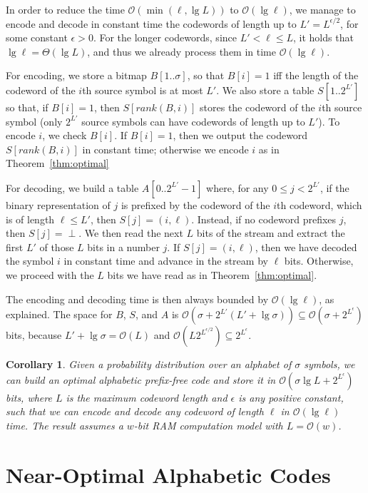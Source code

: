 \documentclass[preprint,12pt]{elsarticle}
\newcommand{\Oh}[1]{\ensuremath{\mathcal{O}\!\left({#1}\right)}}
\renewcommand{\log}{\lg}
\newtheorem{corollary}[theorem]{Corollary}
\begin{document}
In order to reduce the time $\Oh{\min(\ell,\log L)}$ to $\Oh{\log\ell}$, we 
manage to encode and decode in constant time the codewords of length up to
$L' = L^{\epsilon/2}$, for some constant $\epsilon>0$. For the longer codewords,
since $L' < \ell \le L$, it holds that $\log\ell = \Theta(\log L)$, and thus
we already process them in time $\Oh{\log\ell}$.

For encoding, we store a bitmap $B[1..\sigma]$, so that $B[i]=1$ iff the
length of the codeword of the $i$th source symbol is at most $L'$. We also 
store a table $S[1..2^{L'}]$ so that, if $B[i]=1$, then $S[rank(B,i)]$ stores 
the codeword of the $i$th source symbol (only $2^{L'}$ source symbols can have
codewords of length up to $L'$). To encode $i$, we check
$B[i]$. If $B[i]=1$, then we output the codeword $S[rank(B,i)]$ in constant
time; otherwise we encode $i$ as in Theorem~\ref{thm:optimal}

For decoding, we build a table $A[0..2^{L'}-1]$ where, for any 
$0 \le j < 2^{L'}$, if the binary representation of $j$ is prefixed by the 
codeword of the $i$th codeword, which is of length $\ell \le L'$, then
$S[j] = (i,\ell)$. Instead, if no codeword prefixes $j$, then $S[j]=\perp$.
We then read the next $L$ bits of the stream and extract the first $L'$ of those
$L$ bits in a number $j$. If $S[j]=(i,\ell)$, then we have decoded the symbol
$i$ in constant time and advance in the stream by $\ell$ bits. Otherwise, we
proceed with the $L$ bits we have read as in Theorem~\ref{thm:optimal}.

The encoding and decoding time is then always bounded by $\Oh{\log\ell}$, as 
explained. The space for $B$, $S$, and $A$ is 
$\Oh{\sigma + 2^{L'}(L'+\log\sigma)} \subseteq
\Oh{\sigma + 2^{L^\epsilon}}$ bits, because $L'+\log\sigma = \Oh{L}$ and
$\Oh{L2^{L^{\epsilon/2}}} \subseteq 2^{L^\epsilon}$.

\begin{corollary}
\label{cor:optimal}
Given a probability distribution over an alphabet of $\sigma$ symbols, we can 
build an optimal alphabetic prefix-free code and store it in $\Oh{\sigma \lg L+
2^{L^\epsilon}}$ bits, where $L$ is the maximum codeword length and $\epsilon$ 
is any positive constant, such that we can encode and decode any codeword of 
length $\ell$ in $\Oh{\log \ell}$ time.
The result assumes a $w$-bit RAM computation model with $L=\Oh{w}$.
\end{corollary}

\section{Near-Optimal Alphabetic Codes}
\label{sec:alphabetic2}
\end{document}
